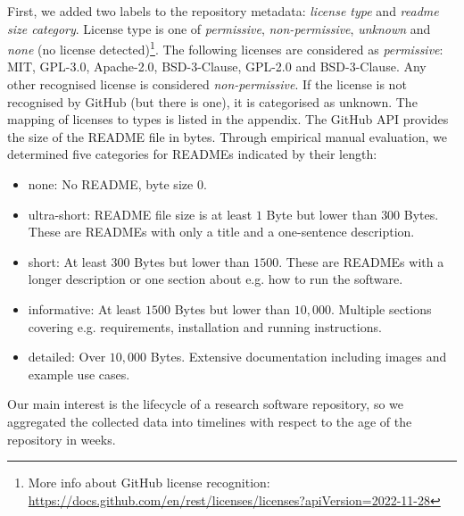 \documentclass[10pt,a4paper]{scrartcl}
\begin{document}
First, we added two labels to the repository metadata: \textit{license type} and \textit{readme size category}.
License type is one of \textit{permissive}, \textit{non-permissive}, \textit{unknown} and \textit{none} (no license detected)\footnote{More info about GitHub license recognition: \url{https://docs.github.com/en/rest/licenses/licenses?apiVersion=2022-11-28}}.
The following licenses are considered as \textit{permissive}: MIT, GPL-3.0, Apache-2.0, BSD-3-Clause, GPL-2.0 and BSD-3-Clause.
Any other recognised license is considered \textit{non-permissive}.
If the license is not recognised by GitHub (but there is one), it is categorised as unknown.
The mapping of licenses to types is listed in the appendix.
The GitHub API provides the size of the README file in bytes.
Through empirical manual evaluation, we determined five categories for READMEs indicated by their length:
\begin{itemize}
    \item none: No README, byte size $0$.
    \item ultra-short: README file size is at least $1$ Byte but lower than $300$ Bytes. These are READMEs with only a title and a one-sentence description.
    \item short: At least $300$ Bytes but lower than $1500$. These are READMEs with a longer description or one section about e.g. how to run the software.
    \item informative: At least $1500$ Bytes but lower than $10,000$. Multiple sections covering e.g. requirements, installation and running instructions.
    \item detailed: Over $10,000$ Bytes. Extensive documentation including images and example use cases.
\end{itemize}

Our main interest is the lifecycle of a research software repository, so we aggregated the collected data into timelines
with respect to the age of the repository in weeks.
\end{document}
